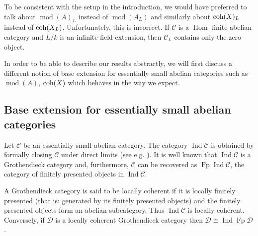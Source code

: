 \documentclass{amsart}
\numberwithin{equation}{section}
\let\cal\mathcal
\theoremstyle{definition}
\theoremstyle{remark}
\begin{document}
To be consistent
with the setup in the introduction, we would have preferred to talk about 
${\operatorname{mod}}(A)_L$ instead of ${\operatorname{mod}}(A_L)$ and similarly about ${\mathop{\text{\upshape{coh}}}}(X)_L$ instead
of ${\mathop{\text{\upshape{coh}}}}(X_L)$.  Unfortunately, this is incorrect.  If ${{\cal C}}$ is a
${\operatorname {Hom}}$-finite abelian category and $L/k$ is an infinite field extension,
then ${{\cal C}}_L$ contains only the zero
object.

In order to be able to describe our results abstractly, we will first discuss
a different notion of base extension for essentially small abelian
categories such as ${\operatorname{mod}}(A)$, ${\mathop{\text{\upshape{coh}}}}(X)$ which behaves in the way we
expect. 
\subsection{Base extension for essentially small abelian categories}
 Let ${{\cal C}}$ be an essentially
small abelian category. The category $\operatorname{Ind} {{\cal C}}$ is obtained by formally closing ${{\cal C}}$ under direct 
limits (see e.g. \cite[\S2.2]{LowenVdB1}).  It is well known that $\operatorname{Ind}{{\cal C}}$ is a Grothendieck category and, furthermore,
${{\cal C}}$ can be recovered as ${\operatorname{Fp}}\operatorname{Ind}{{\cal C}}$, the category of finitely presented objects in $\operatorname{Ind}{{\cal C}}$. 

A Grothendieck category is said to be locally coherent if it is
locally finitely presented (that is: generated by its finitely
presented objects) and the finitely presented objects form an abelian
subcategory. Thus $\operatorname{Ind} {{\cal C}}$ is locally coherent.  Conversely, if
${{\cal D}}$ is a locally coherent Grothendieck category then
${{\cal D}}\cong\operatorname{Ind}{\operatorname{Fp}}{{\cal D}}$.
\end{document}
